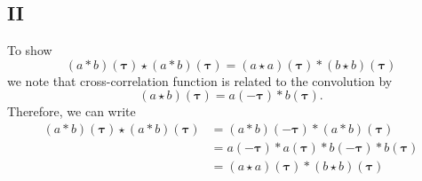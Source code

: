 \documentclass[]{article}
\begin{document}
\subsection*{II}
To show  
\begin{equation}
(a \ast b)(\boldsymbol \tau) \star (a \ast b)(\boldsymbol\tau)=(a \star a)(\boldsymbol\tau)\ast(b \star b)(\boldsymbol\tau)
\end{equation}
we note that cross-correlation function is related to the convolution by 
\begin{equation}
 \left(a \star b\right)\left(\boldsymbol\tau\right)= a\left(-\boldsymbol\tau \right)\ast b\left(\boldsymbol\tau\right).
\end{equation}
Therefore, we can write
\begin{align}
 (a \ast b)(\boldsymbol \tau) \star (a \ast b)(\boldsymbol\tau)&=(a \ast b)(-\boldsymbol\tau) \ast (a \ast b)(\boldsymbol\tau) \nonumber \\
&=a(-\boldsymbol\tau)\ast a(\boldsymbol\tau) \ast b(-\boldsymbol\tau)\ast b(\boldsymbol\tau) \nonumber \\
&=(a \star a)(\boldsymbol\tau)\ast(b \star b)(\boldsymbol\tau)
\end{align}


\end{document}

